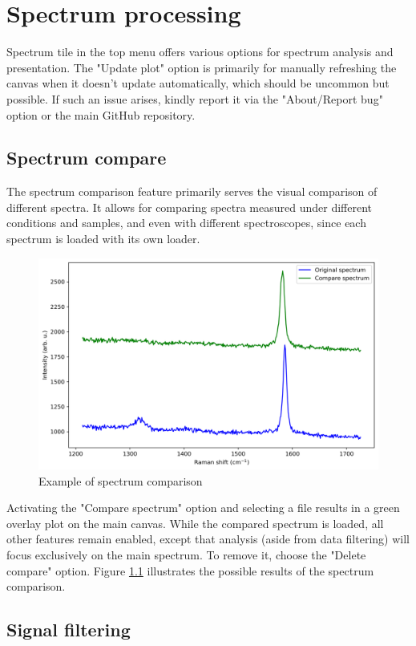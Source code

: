 \chapter{Spectrum processing}
\label{cha:Spectrum}

Spectrum tile in the top menu offers various options for spectrum analysis and presentation. The "Update plot" option is primarily for manually refreshing the canvas when it doesn't update automatically, which should be uncommon but possible. If such an issue arises, kindly report it via the "About/Report bug" option or the main GitHub repository.

\section{Spectrum compare}

The spectrum comparison feature primarily serves the visual comparison of different spectra. It allows for comparing spectra measured under different conditions and samples, and even with different spectroscopes, since each spectrum is loaded with its own loader.

\begin{figure}[H]
    \centering
    \includegraphics[width=0.8\linewidth]{Resources/Compare.png}
    \caption{Example of spectrum comparison}
    \label{compare}
\end{figure}

Activating the "Compare spectrum" option and selecting a file results in a green overlay plot on the main canvas. While the compared spectrum is loaded, all other features remain enabled, except that analysis (aside from data filtering) will focus exclusively on the main spectrum. To remove it, choose the "Delete compare" option. Figure \ref{compare} illustrates the possible results of the spectrum comparison.

\section{Signal filtering}

